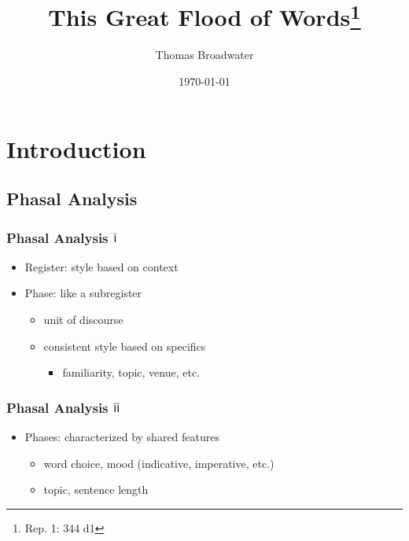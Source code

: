 \documentclass{beamer}
\title{This Great Flood of Words\thanks{Rep. 1: 344 d1}}
\author{Thomas Broadwater}
\date{\today}
\renewcommand{\Roman}[1]{$\overline{\textsf{\small{\MakeUppercase{\romannumeral #1}}}}$}
\begin{document}


\begin{frame}
\titlepage
\end{frame}




\section{Introduction} %

\subsection{Phasal Analysis} %

\begin{frame}
\frametitle{Phasal Analysis \Roman{1}}
\begin{itemize}
\item Register: style based on context
\item Phase: like a subregister
  \begin{itemize}
  \item unit of discourse
  \item consistent style based on specifics
    \begin{itemize}
    \item familiarity, topic, venue, etc.
  \end{itemize}
  \end{itemize}
\end{itemize}
\end{frame}



\begin{frame}
\frametitle{Phasal Analysis \Roman{2}}
\begin{itemize}
\item Phases: characterized by shared features
  \begin{itemize}
  \item word choice, mood (indicative, imperative, etc.)
  \item topic, sentence length
  \end{itemize}
\end{itemize}
\end{frame}
\end{document}
